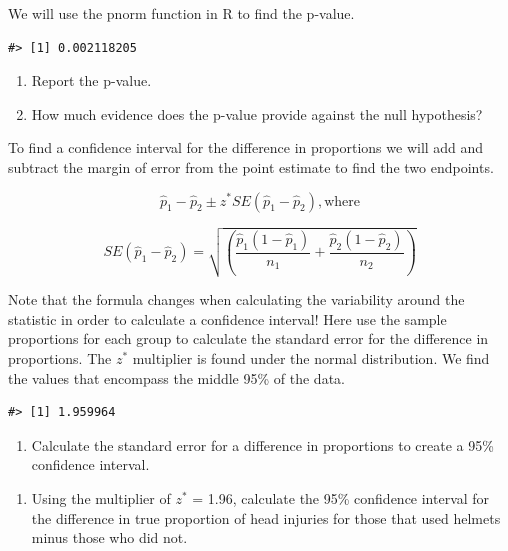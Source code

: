 \documentclass[
]{report}
\providecommand{\tightlist}{%
  \setlength{\itemsep}{0pt}\setlength{\parskip}{0pt}}
\begin{document}
We will use the pnorm function in R to find the p-value.

\begin{verbatim}
#> [1] 0.002118205
\end{verbatim}

\begin{enumerate}
\def\labelenumi{\arabic{enumi}.}
\setcounter{enumi}{19}
\item
  Report the p-value.
  \vspace{0.5in}
\item
  How much evidence does the p-value provide against the null hypothesis?
\end{enumerate}

\vspace{0.5in}

To find a confidence interval for the difference in proportions we will add and subtract the margin of error from the point estimate to find the two endpoints.

\[\hat{p}_1-\hat{p}_2\pm z^*SE(\hat{p}_1-\hat{p}_2), \text{where}\]

\[SE(\hat{p}_1-\hat{p}_2) = \sqrt{\left(\frac{\hat{p}_1 (1-\hat{p}_1)}{n_1}+\frac{\hat{p}_2 (1-\hat{p}_2)}{n_2}\right)}\]

Note that the formula changes when calculating the variability around the statistic in order to calculate a confidence interval! Here use the sample proportions for each group to calculate the standard error for the difference in proportions. The \(z^*\) multiplier is found under the normal distribution. We find the values that encompass the middle 95\% of the data.

\begin{verbatim}
#> [1] 1.959964
\end{verbatim}

\begin{enumerate}
\def\labelenumi{\arabic{enumi}.}
\setcounter{enumi}{21}
\tightlist
\item
  Calculate the standard error for a difference in proportions to create a 95\% confidence interval.
\end{enumerate}

\vspace{1in}

\begin{enumerate}
\def\labelenumi{\arabic{enumi}.}
\setcounter{enumi}{22}
\tightlist
\item
  Using the multiplier of \(z^*\) = 1.96, calculate the 95\% confidence interval for the difference in true proportion of head injuries for those that used helmets minus those who did not.
\end{enumerate}
\end{document}
